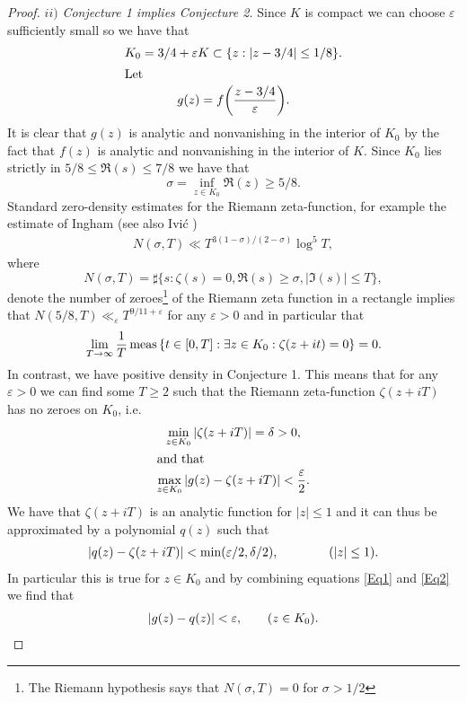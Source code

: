 \documentclass[11pt]{article}
\begin{document}
\begin{proof}
 $ii)$ {\em Conjecture 1 implies Conjecture 2.}  
   Since $K$ is compact we can choose $\varepsilon$ sufficiently small so  we have that 
   \begin{gather*} K_0=3/4+\varepsilon K  \subset \{z:|z-3/4| \leq 1/8 \}. \\ \intertext{Let} 
g(z)=f{\left( {\frac{z-3/4} \varepsilon} \right)}.
\end{gather*}
It is clear that $g(z)$  is analytic and nonvanishing in the interior of $K_0$ by the fact that $f(z)$  is analytic and nonvanishing in the interior of $K$.   Since $K_0$ lies strictly in $5/8\leq \Re(s)\leq 7/8$ we have that 
$$\sigma=\inf_{z \in K_0} \Re(z) \geq 5/8.$$ 
Standard zero-density estimates for the Riemann zeta-function, for example the estimate of Ingham \cite{Ingham} (see also Ivi{\'c} \cite[Chapter 11]{Ivic})
\begin{gather*}
  N(\sigma,T)\ll  T^{3(1-\sigma)/(2-\sigma)}\log^5 T,
 \end{gather*}
 where $$N(\sigma,T)=\sharp{} \{s:\zeta(s)=0, \Re(s) \geq \sigma, |\Im(s)| \leq T  \},$$  
denote the number of zeroes\footnote{The Riemann hypothesis says that $N(\sigma,T)=0$ for $\sigma>1/2$} of the Riemann zeta function in a rectangle  implies that $N(5/8,T)\ll_\varepsilon T^{9/11+\varepsilon}$ for any $\varepsilon>0$ and in particular that
$$\lim_{T \to \infty} \frac 1 T \mathop{\rm meas} \left \{t \in [0,T]:\exists z \in K_0:\zeta(z+it)=0\right \}=0. $$
In contrast, we have positive density in Conjecture 1. This means that for any $\varepsilon>0$ we can find some $T \geq 2$ such that the Riemann zeta-function $\zeta(z+iT)$ has no zeroes on $K_0$, i.e.
\begin{gather} \label{Eq0}
  \min_{z \in K_0} \abs{\zeta(z+iT)} = \delta>0, \\ \intertext{and that}
 \label{Eq1}
  \max_{z \in K_0}\abs{g(z)-\zeta(z+iT)}<\frac \varepsilon 2.
\end{gather}
We have that $\zeta(z+iT)$ is an analytic function for $|z| \leq 1$   and it can thus be approximated by a polynomial $q(z)$ such that
\begin{gather} \label{Eq2}
  \abs{ q(z) -\zeta(z+iT)} <\min (\varepsilon/2,\delta/2), \qquad \qquad (\abs{z} \leq 1).
\end{gather}
In particular this is true for $z \in K_0$ and by combining equations \eqref{Eq1} and \eqref{Eq2} we find that
\begin{gather} \label{Eq88}
  \abs{g(z)-q(z)}<\varepsilon, \qquad (z \in K_0).
\end{gather}

\end{proof}
\end{document}
